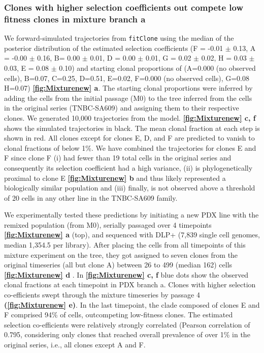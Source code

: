 \subsubsection{Clones with higher selection coefficients out compete low fitness clones in mixture branch a}
We forward-simulated trajectories from \texttt{fitClone} using the median of the posterior distribution of the estimated selection coefficients (F = -0.01  $\pm$ 0.13, A = -0.00 $\pm$ 0.16, B= 0.00 $\pm$  0.01, D = 0.00  $\pm$  0.01, G = 0.02  $\pm$  0.02, H = 0.03  $\pm$  0.03, E = 0.08  $\pm$ 0.10) and starting clonal proportions of (A=0.000 (no observed cells), B=0.07, C=0.25, D=0.51, E=0.02, F=0.000 (no observed cells), G=0.08 H=0.07) \textbf{\autoref{fig:Mixturenew} a}. The starting clonal proportions were inferred by adding the cells from the initial passage (M0) to the tree inferred from the cells in the original series (TNBC-SA609) and assigning them to their respective clones. We generated 10,000 trajectories from the model. \textbf{\autoref{fig:Mixturenew} c, f} shows the simulated trajectories in black.
The mean clonal fraction at each step is shown in red. All clones except for clones E, D, and F are predicted to vanish to clonal fractions of below 1\%. We have combined the trajectories for clones E and F since clone F (i) had fewer than 19 total cells in the original series and consequently its selection coefficient had a high variance, (ii) is phylogenetically proximal to clone E \textbf{\autoref{fig:Mixturenew} b} and thus likely represented a biologically similar population and (iii) finally, is not observed above a threshold of 20 cells in any other line in the TNBC-SA609 family.

We experimentally tested these predictions by initiating a new PDX line with the remixed population (from M0), serially passaged over 4 timepoints \textbf{\autoref{fig:Mixturenew} a} (top), and sequenced with DLP+ (7,839 single cell genomes, median 1,354.5 per library). After placing the cells from all timepoints of this mixture experiment on the tree, they got assigned to seven clones from the original timeseries (all but clone A) between 26 to 499 (median 162) cells \textbf{\autoref{fig:Mixturenew} d} . In \textbf{\autoref{fig:Mixturenew} c, f} blue dots show the observed clonal fractions at each timepoint in PDX branch a. Clones with higher selection co-efficients swept through the mixture timeseries by passage 4 \textbf{(\autoref{fig:Mixturenew} e)}. In the last timepoint, the clade composed of clones E and F comprised 94\% of cells, outcompeting low-fitness clones. The estimated selection co-efficients were relatively strongly correlated (Pearson correlation of 0.795, considering only clones that reached overall prevalence of over 1\% in the original series, i.e., all clones except A and F.


